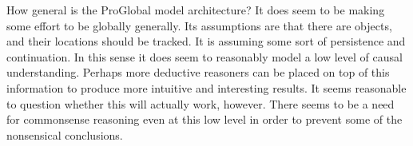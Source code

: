 \documentclass[11pt,a4paper]{article}
\begin{document}
How general is the ProGlobal model architecture? It does seem to be making some effort to be globally generally. Its assumptions are that there are objects, and their locations should be tracked. It is assuming some sort of persistence and continuation. In this sense it does seem to reasonably model a low level of causal understanding. Perhaps more deductive reasoners can be placed on top of this information to produce more intuitive and interesting results. It seems reasonable to question whether this will actually work, however. There seems to be a need for commonsense reasoning even at this low level in order to prevent some of the nonsensical conclusions.

%
%
\end{document}

